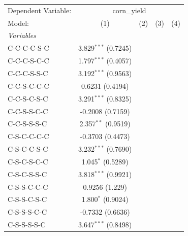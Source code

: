 
\begingroup
\centering
\begin{tabular}{lcccc}
   \tabularnewline \midrule \midrule
   Dependent Variable: & \multicolumn{4}{c}{corn\_yield}\\
   Model:            & (1)                     & (2)                    & (3)                    & (4)\\  
   \midrule
   \emph{Variables}\\
   C-C-C-C-S-C       & 3.829$^{***}$ (0.7245)  &                        &                        &   \\   
   C-C-C-S-C-C       & 1.797$^{***}$ (0.4057)  &                        &                        &   \\   
   C-C-C-S-S-C       & 3.192$^{***}$ (0.9563)  &                        &                        &   \\   
   C-C-S-C-C-C       & 0.6231 (0.4194)         &                        &                        &   \\   
   C-C-S-C-S-C       & 3.291$^{***}$ (0.8325)  &                        &                        &   \\   
   C-C-S-S-C-C       & -0.2008 (0.7159)        &                        &                        &   \\   
   C-C-S-S-S-C       & 2.357$^{**}$ (0.9519)   &                        &                        &   \\   
   C-S-C-C-C-C       & -0.3703 (0.4473)        &                        &                        &   \\   
   C-S-C-C-S-C       & 3.232$^{***}$ (0.7690)  &                        &                        &   \\   
   C-S-C-S-C-C       & 1.045$^{*}$ (0.5289)    &                        &                        &   \\   
   C-S-C-S-S-C       & 3.818$^{***}$ (0.9921)  &                        &                        &   \\   
   C-S-S-C-C-C       & 0.9256 (1.229)          &                        &                        &   \\   
   C-S-S-C-S-C       & 1.800$^{*}$ (0.9024)    &                        &                        &   \\   
   C-S-S-S-C-C       & -0.7332 (0.6636)        &                        &                        &   \\   
   C-S-S-S-S-C       & 3.647$^{***}$ (0.8498)  &                        &                        &   \\   

\end{tabular}

